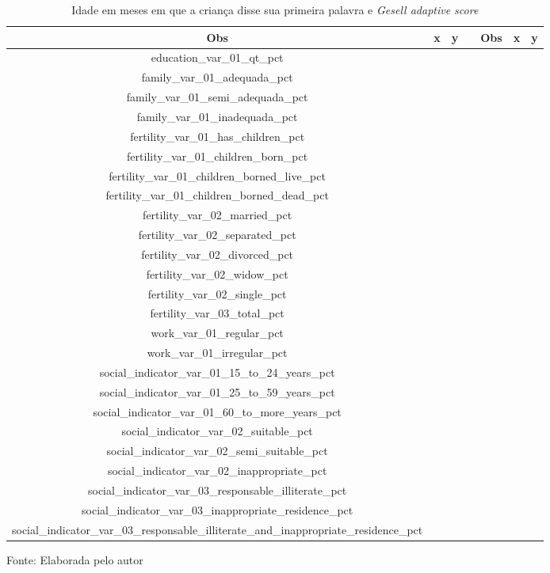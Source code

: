 \begin{table}[h] 
\centering
\caption{Idade em meses em que a criança disse sua primeira palavra e  \textit{Gesell adaptive score}}
\label{tab:chap02_data}
\begin{tabular}{ccccccc}
\mbox{Obs} & x & y & & \mbox{Obs} & x & y \\
\hline
education_var_01_qt_pct \\
family_var_01_adequada_pct \\
family_var_01_semi_adequada_pct \\
family_var_01_inadequada_pct \\
fertility_var_01_has_children_pct \\
fertility_var_01_children_born_pct \\
fertility_var_01_children_borned_live_pct \\
fertility_var_01_children_borned_dead_pct \\
fertility_var_02_married_pct \\
fertility_var_02_separated_pct \\
fertility_var_02_divorced_pct \\
fertility_var_02_widow_pct \\
fertility_var_02_single_pct \\
fertility_var_03_total_pct \\
work_var_01_regular_pct \\
work_var_01_irregular_pct \\
social_indicator_var_01_15_to_24_years_pct \\
social_indicator_var_01_25_to_59_years_pct \\
social_indicator_var_01_60_to_more_years_pct \\
social_indicator_var_02_suitable_pct \\
social_indicator_var_02_semi_suitable_pct \\
social_indicator_var_02_inappropriate_pct \\
social_indicator_var_03_responsable_illiterate_pct \\
social_indicator_var_03_inappropriate_residence_pct \\
social_indicator_var_03_responsable_illiterate_and_inappropriate_residence_pct \\
\hline
\end{tabular}

Fonte: Elaborada pelo autor
\end{table}
